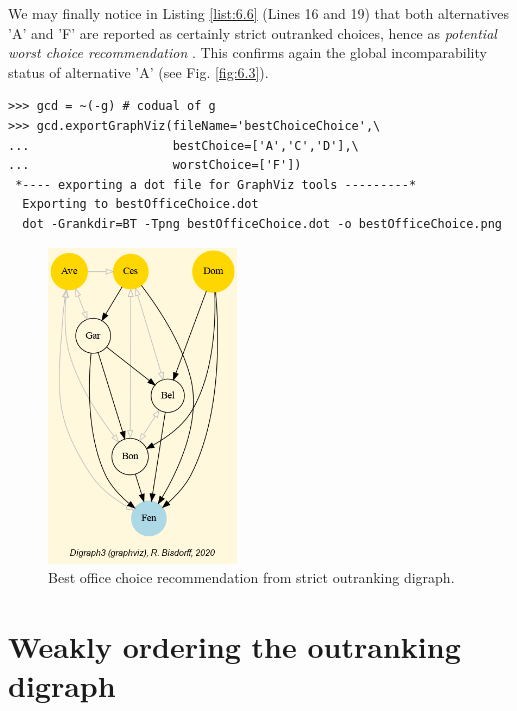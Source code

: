 We may finally notice in Listing \ref{list:6.6} (Lines 16 and 19) that both alternatives 'A' and 'F' are reported as certainly strict outranked choices, hence as \emph{potential worst choice recommendation} . This confirms again the global incomparability status of alternative 'A' (see Fig. \ref{fig:6.3}).
\begin{lstlisting}
>>> gcd = ~(-g) # codual of g
>>> gcd.exportGraphViz(fileName='bestChoiceChoice',\
...                    bestChoice=['A','C','D'],\
...                    worstChoice=['F'])
 *---- exporting a dot file for GraphViz tools ---------*
  Exporting to bestOfficeChoice.dot
  dot -Grankdir=BT -Tpng bestOfficeChoice.dot -o bestOfficeChoice.png
\end{lstlisting}
\begin{figure}[h]
\sidecaption[t]
\includegraphics[width=5cm]{Figures/bestOfficeChoice.png}
\caption{Best office choice recommendation from strict outranking digraph.}
\label{fig:6.4}       %
\end{figure}

\section{Weakly ordering the outranking digraph}
\label{sec:6.6}

